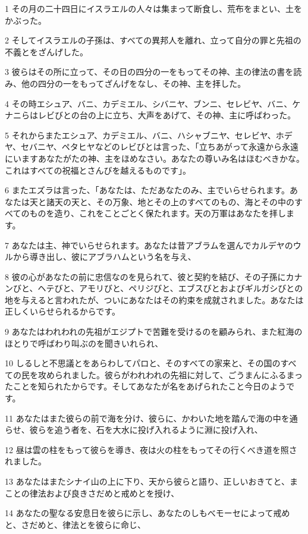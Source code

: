 \par 1 その月の二十四日にイスラエルの人々は集まって断食し、荒布をまとい、土をかぶった。
\par 2 そしてイスラエルの子孫は、すべての異邦人を離れ、立って自分の罪と先祖の不義とをざんげした。
\par 3 彼らはその所に立って、その日の四分の一をもってその神、主の律法の書を読み、他の四分の一をもってざんげをなし、その神、主を拝した。
\par 4 その時エシュア、バニ、カデミエル、シバニヤ、ブンニ、セレビヤ、バニ、ケナニらはレビびとの台の上に立ち、大声をあげて、その神、主に呼ばわった。
\par 5 それからまたエシュア、カデミエル、バニ、ハシャブニヤ、セレビヤ、ホデヤ、セバニヤ、ペタヒヤなどのレビびとは言った、「立ちあがって永遠から永遠にいますあなたがたの神、主をほめなさい。あなたの尊いみ名はほむべきかな。これはすべての祝福とさんびを越えるものです」。
\par 6 またエズラは言った、「あなたは、ただあなたのみ、主でいらせられます。あなたは天と諸天の天と、その万象、地とその上のすべてのもの、海とその中のすべてのものを造り、これをことごとく保たれます。天の万軍はあなたを拝します。
\par 7 あなたは主、神でいらせられます。あなたは昔アブラムを選んでカルデヤのウルから導き出し、彼にアブラハムという名を与え、
\par 8 彼の心があなたの前に忠信なのを見られて、彼と契約を結び、その子孫にカナンびと、ヘテびと、アモリびと、ペリジびと、エブスびとおよびギルガシびとの地を与えると言われたが、ついにあなたはその約束を成就されました。あなたは正しくいらせられるからです。
\par 9 あなたはわれわれの先祖がエジプトで苦難を受けるのを顧みられ、また紅海のほとりで呼ばわり叫ぶのを聞きいれられ、
\par 10 しるしと不思議とをあらわしてパロと、そのすべての家来と、その国のすべての民を攻められました。彼らがわれわれの先祖に対して、ごうまんにふるまったことを知られたからです。そしてあなたが名をあげられたこと今日のようです。
\par 11 あなたはまた彼らの前で海を分け、彼らに、かわいた地を踏んで海の中を通らせ、彼らを追う者を、石を大水に投げ入れるように淵に投げ入れ、
\par 12 昼は雲の柱をもって彼らを導き、夜は火の柱をもってその行くべき道を照されました。
\par 13 あなたはまたシナイ山の上に下り、天から彼らと語り、正しいおきてと、まことの律法および良きさだめと戒めとを授け、
\par 14 あなたの聖なる安息日を彼らに示し、あなたのしもべモーセによって戒めと、さだめと、律法とを彼らに命じ、
